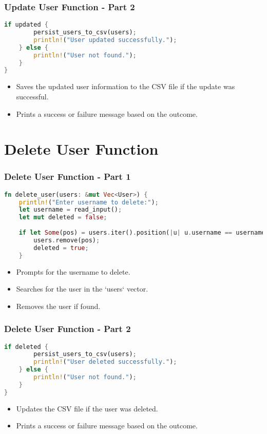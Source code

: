 \documentclass[aspectratio=169, table]{beamer}
\begin{document}
\begin{frame}[fragile]
\frametitle{Update User Function - Part 2}
\begin{lstlisting}[language=Rust]
	if updated {
		persist_users_to_csv(users);
		println!("User updated successfully.");
	} else {
		println!("User not found.");
	}
}
\end{lstlisting}
\begin{itemize}
\item Saves the updated user information to the CSV file if the update was successful.
\item Prints a success or failure message based on the outcome.
\end{itemize}
\end{frame}


\section{Delete User Function}

\begin{frame}[fragile]
\frametitle{Delete User Function - Part 1}
\begin{lstlisting}[language=Rust]
fn delete_user(users: &mut Vec<User>) {
	println!("Enter username to delete:");
	let username = read_input();
	let mut deleted = false;
	
	if let Some(pos) = users.iter().position(|u| u.username == username) {
		users.remove(pos);
		deleted = true;
	}
\end{lstlisting}
\begin{itemize}
	\item Prompts for the username to delete.
	\item Searches for the user in the `users` vector.
	\item Removes the user if found.
\end{itemize}
\end{frame}

\begin{frame}[fragile]
\frametitle{Delete User Function - Part 2}
\begin{lstlisting}[language=Rust]
	if deleted {
		persist_users_to_csv(users);
		println!("User deleted successfully.");
	} else {
		println!("User not found.");
	}
}
\end{lstlisting}
\begin{itemize}
\item Updates the CSV file if the user was deleted.
\item Prints a success or failure message based on the outcome.
\end{itemize}
\end{frame}
\end{document}
